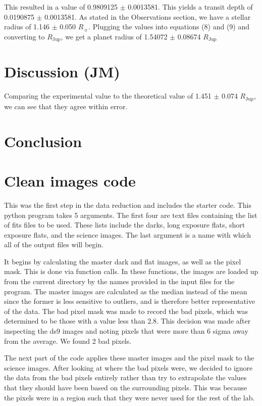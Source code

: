 \documentclass{aastex61}
\begin{document}
This resulted in a value of 0.9809125 $\pm$ 0.0013581. This yields a transit depth of 0.0190875 $\pm$ 0.0013581. As stated in the Observations section, we have a stellar radius of 1.146 $\pm$ 0.050 $R_{\sun}$. Plugging the values into equations (8) and (9) and converting to $R_{\text{Jup}}$, we get a planet radius of 1.54072 $\pm$ 0.08674 $R_{\text{Jup}}$
\section{Discussion (JM)}
Comparing the experimental value to the theoretical value of 1.451 $\pm$ 0.074 $R_{\text{Jup}}$, we can see that they agree within error. 
\section{Conclusion}

\begin{thebibliography}{9}	
\end{thebibliography}

\appendix
\section{Clean images code} \label{code: reduction}
This was the first step in the data reduction and includes the starter code. This python program takes 5 arguments. The first four are text files containing the list of fits files to be used. These lists include the darks, long exposure flats, short exposure flats, and the science images. The last argument is a name with which all of the output files will begin. 

It begins by calculating the master dark and flat images, as well as the pixel mask. This is done via function calls. In these functions, the images are loaded up from the current directory by the names provided in the input files for the program. The master images are calculated as the median instead of the mean since the former is less sensitive to outliers, and is therefore better representative of the data. The bad pixel mask was made to record the bad pixels, which was determined to be those with a value less than 2.8. This decision was made after inspecting the ds9 images and noting pixels that were more than 6 sigma away from the average. We found 2 bad pixels.

The next part of the code applies these master images and the pixel mask to the science images. After looking at where the bad pixels were, we decided to ignore the data from the bad pixels entirely rather than try to extrapolate the values that they should have been based on the surrounding pixels. This was because the pixels were in a region such that they were never used for the rest of the lab.
\end{document}
